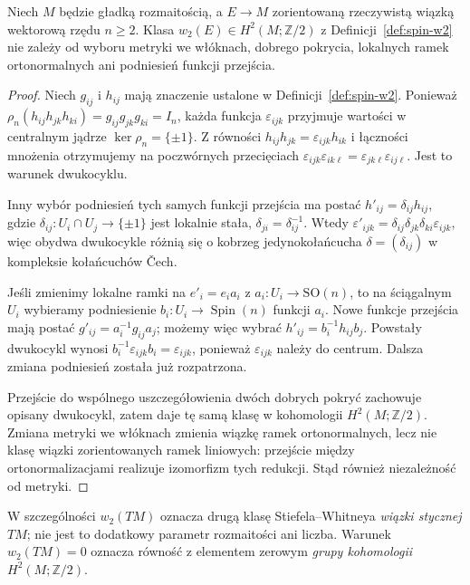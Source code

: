 \begin{stwierdzenie}
\label{prop:spin-w2-dobrze-okreslona}
Niech $M$ będzie gładką rozmaitością, a $E\to M$
zorientowaną rzeczywistą wiązką wektorową rzędu $n\geq2$.
Klasa $w_2(E)\in H^2(M;\mathbb Z/2)$ z
Definicji~\ref{def:spin-w2} nie zależy od wyboru
metryki we włóknach, dobrego pokrycia, lokalnych ramek
ortonormalnych ani podniesień funkcji przejścia.
\end{stwierdzenie}
\begin{proof}
Niech $g_{ij}$ i $h_{ij}$ mają znaczenie ustalone
w Definicji~\ref{def:spin-w2}. Ponieważ
$\rho_n(h_{ij}h_{jk}h_{ki})=g_{ij}g_{jk}g_{ki}=I_n$,
każda funkcja $\varepsilon_{ijk}$ przyjmuje wartości
w centralnym jądrze $\ker\rho_n=\{\pm1\}$.
Z równości $h_{ij}h_{jk}=\varepsilon_{ijk}h_{ik}$
i łączności mnożenia otrzymujemy na poczwórnych
przecięciach
$\varepsilon_{ijk}\varepsilon_{ik\ell}
=\varepsilon_{jk\ell}\varepsilon_{ij\ell}$.
Jest to warunek dwukocyklu.

Inny wybór podniesień tych samych funkcji przejścia
ma postać $h'_{ij}=\delta_{ij}h_{ij}$, gdzie
$\delta_{ij}:U_i\cap U_j\to\{\pm1\}$ jest lokalnie stała,
$\delta_{ji}=\delta_{ij}^{-1}$. Wtedy
$\varepsilon'_{ijk}=\delta_{ij}\delta_{jk}\delta_{ki}
\varepsilon_{ijk}$, więc obydwa dwukocykle różnią się
o kobrzeg jedynokołańcucha $\delta=(\delta_{ij})$
w kompleksie kołańcuchów \v{C}ech.

Jeśli zmienimy lokalne ramki na $e'_i=e_i a_i$
z $a_i:U_i\to\mathrm{SO}(n)$, to na ściągalnym $U_i$
wybieramy podniesienie $b_i:U_i\to\operatorname{Spin}(n)$
funkcji $a_i$. Nowe funkcje przejścia mają postać
$g'_{ij}=a_i^{-1}g_{ij}a_j$; możemy więc wybrać
$h'_{ij}=b_i^{-1}h_{ij}b_j$. Powstały dwukocykl
wynosi $b_i^{-1}\varepsilon_{ijk}b_i=\varepsilon_{ijk}$,
ponieważ $\varepsilon_{ijk}$ należy do centrum.
Dalsza zmiana podniesień została już rozpatrzona.

Przejście do wspólnego uszczegółowienia dwóch dobrych
pokryć zachowuje opisany dwukocykl, zatem daje tę samą
klasę w kohomologii $H^2(M;\mathbb Z/2)$.
Zmiana metryki we włóknach zmienia wiązkę ramek
ortonormalnych, lecz nie klasę wiązki zorientowanych
ramek liniowych: przejście między ortonormalizacjami
realizuje izomorfizm tych redukcji. Stąd również
niezależność od metryki.
\end{proof}

W szczególności $w_2(TM)$ oznacza drugą klasę
Stiefela--Whitneya \emph{wiązki stycznej} $TM$;
nie jest to dodatkowy parametr rozmaitości ani liczba.
Warunek $w_2(TM)=0$ oznacza równość z elementem zerowym
\emph{grupy kohomologii} $H^2(M;\mathbb Z/2)$.

